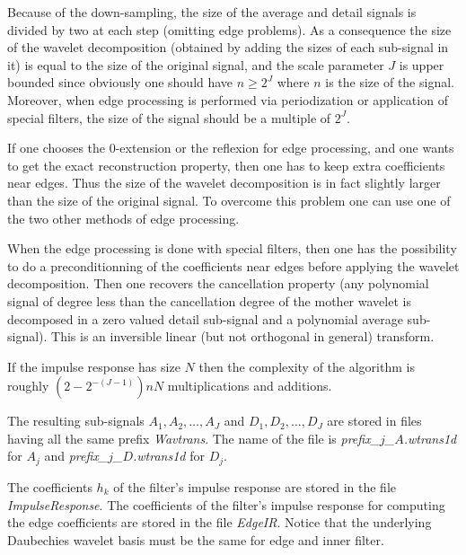 Because of the down-sampling, the size of the average and detail signals is divided by two at each step (omitting edge problems). As a consequence the size of the wavelet decomposition (obtained by adding the sizes of each sub-signal in it) is equal to the size of the original signal, and the scale parameter \( J \) is upper bounded since obviously one should have \( n \geq 2^{J} \) where \( n \) is the size of the signal. Moreover, when edge processing is performed via periodization or application of special filters, the size of the signal should be a multiple of $2^J$.

If one chooses the 0-extension or the reflexion for edge processing, and one wants to get the exact reconstruction property, then one has to keep extra coefficients near edges. Thus the size of the wavelet decomposition is in fact slightly larger than the size of the original signal. To overcome this problem one can use one of the two other methods of edge processing. 

When the edge processing is done with special filters, then one has the possibility to do a preconditionning of the coefficients near edges before applying the wavelet decomposition. Then one recovers the cancellation property (any polynomial signal of degree less than the cancellation degree of the mother wavelet is decomposed in a zero valued detail sub-signal and a polynomial average sub-signal). This is an inversible linear (but not orthogonal in general) transform.

If the impulse response has size \( N \) then the complexity of the algorithm is roughly \( (2 - 2^{-(J-1)})nN \) multiplications and additions. 

The resulting sub-signals \( A_{1}, A_{2}, \ldots, A_{J} \) and \( D_{1}, D_{2}, \ldots, D_{J} \) are stored in files having all the same prefix {\em Wavtrans}. The name of the file is {\em prefix\_$j$\_$A$.wtrans1d} for \( A_{j} \) and {\em prefix\_$j$\_$D$.wtrans1d} for \( D_{j} \).

The coefficients \( h_{k} \) of the filter's impulse response are stored in the file {\em ImpulseResponse}. The coefficients of the filter's impulse response for computing the edge coefficients are stored in the file {\em EdgeIR}. Notice that the underlying Daubechies wavelet basis must be the same for edge and inner filter. 

